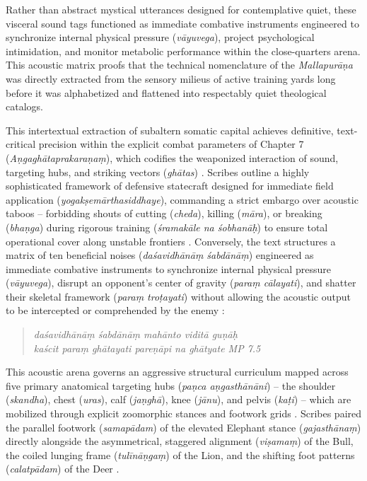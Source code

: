 \documentclass[11pt,twoside,letterpaper]{article}
\begin{document}
Rather than abstract mystical utterances designed for contemplative quiet, these visceral sound tags functioned as immediate combative instruments engineered to synchronize internal physical pressure (\textit{vāyuvega}), project psychological intimidation, and monitor metabolic performance within the close-quarters arena. This acoustic matrix proofs that the technical nomenclature of the \textit{Mallapurāṇa} was directly extracted from the sensory milieus of active training yards long before it was alphabetized and flattened into respectably quiet theological catalogs.

This intertextual extraction of subaltern somatic capital achieves definitive, text-critical precision within the explicit combat parameters of Chapter 7 (\textit{Aṇgaghātaprakaraṇaṃ}), which codifies the weaponized interaction of sound, targeting hubs, and striking vectors (\textit{ghātas}) \citep{MP_7}. Scribes outline a highly sophisticated framework of defensive statecraft designed for immediate field application (\textit{yogakṣemārthasiddhaye}), commanding a strict embargo over acoustic taboos -- forbidding shouts of cutting (\textit{cheda}), killing (\textit{māra}), or breaking (\textit{bhaṇga}) during rigorous training (\textit{śramakāle na śobhanāḥ}) to ensure total operational cover along unstable frontiers \citep{MP_7}. Conversely, the text structures a matrix of ten beneficial noises (\textit{daśavidhānāṃ śabdānāṃ}) engineered as immediate combative instruments to synchronize internal physical pressure (\textit{vāyuvega}), disrupt an opponent's center of gravity (\textit{paraṃ cālayati}), and shatter their skeletal framework (\textit{paraṃ troṭayati}) without allowing the acoustic output to be intercepted or comprehended by the enemy \citep{MP_7}:

\begin{quote}
\small
\textit{daśavidhānāṃ śabdānāṃ mahānto viditā guṇāḥ \\
kaścit paraṃ ghātayati pareṇāpi na ghātyate MP 7.5}
\end{quote}

This acoustic arena governs an aggressive structural curriculum mapped across five primary anatomical targeting hubs (\textit{paṇca aṇgasthānāni}) -- the shoulder (\textit{skandha}), chest (\textit{uras}), calf (\textit{jaṇghā}), knee (\textit{jānu}), and pelvis (\textit{kaṭi}) -- which are mobilized through explicit zoomorphic stances and footwork grids \citep{MP_7}. Scribes paired the parallel footwork (\textit{samapādam}) of the elevated Elephant stance (\textit{gajasthānaṃ}) directly alongside the asymmetrical, staggered alignment (\textit{viṣamaṃ}) of the Bull, the coiled lunging frame (\textit{tulīnāṇgaṃ}) of the Lion, and the shifting foot patterns (\textit{calatpādam}) of the Deer \citep{MP_7}. 
\end{document}
